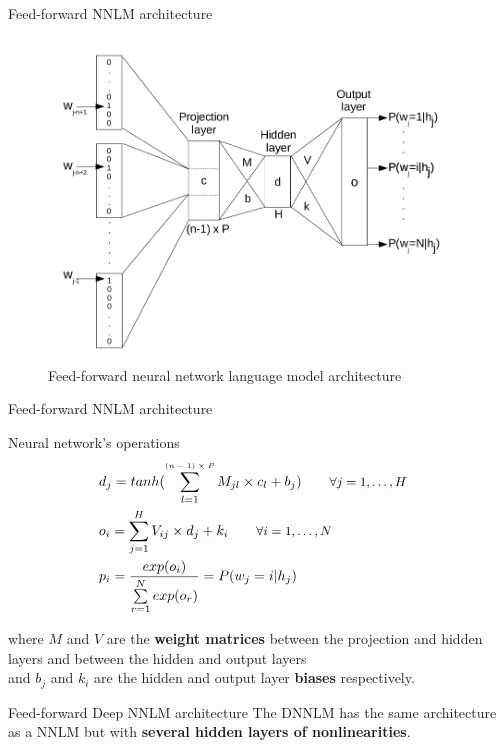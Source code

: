 \documentclass{beamer}
\begin{document}
\begin{frame}{Feed-forward NNLM architecture}

\begin{figure}[!htb]\centering
    \includegraphics[width=0.8\linewidth]{./images/architecture.png}
    \caption{Feed-forward neural network language model architecture}\label{diagram:architecture}
\end{figure}

\end{frame}


\begin{frame}{Feed-forward NNLM architecture}

\begin{exampleblock}{Neural network's operations}
\begin{equation}
\left.\begin{aligned}
    &d_j = tanh(\sum\limits_{l=1}^{\text{\tiny{$(n-1) \times P$}}}{M_{jl} \times c_l + b_j}) \qquad \text{\small{$\forall j = 1, \ldots, H$}}&\\
    &o_i = \sum\limits_{j=1}^{H}{V_{ij} \times d_j + k_i} \qquad \text{\small{$\forall i = 1, \ldots, N$}}&\\
    &p_i = \frac{exp(o_i)}{\sum\limits_{r=1}^{N}{exp(o_r)}} = P(w_j = i | h_j)&\\
\end{aligned}\right.
\end{equation}
\end{exampleblock}

where $M$ and $V$ are the \textbf{weight matrices} between the projection and hidden layers and between the hidden and output layers \\and $b_j$ and $k_i$ are the hidden and output layer \textbf{biases} respectively.

\end{frame}


\begin{frame}{Feed-forward Deep NNLM architecture}
	The DNNLM has the same architecture as a NNLM but with \textbf{several hidden layers of nonlinearities}.
\end{frame}
\end{document}
